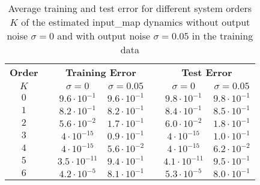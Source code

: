 \begin{commentnotes}
\begin{table}
        \renewcommand{\arraystretch}{1.3}
        \begin{tabularx}{1\textwidth}{@{}ccccccc@{}}
            \toprule
            \textbf{Order} & \phantom{a} & \multicolumn{2}{c}{\textbf{Training Error}} & \phantom{abc} & \multicolumn{2}{c}{\textbf{Test Error}} \\ \cmidrule{3-4} \cmidrule{6-7}
            $K$ && $\sigma = 0$ & $\sigma = 0.05$ && $\sigma = 0$ & $\sigma = 0.05$ \\ \midrule
            $0$ && $9.6 \cdot 10^{-1}$ & $9.6 \cdot 10^{-1}$ && $9.8 \cdot 10^{-1}$ & $9.8 \cdot 10^{-1}$ \\
            $1$ && $8.2 \cdot 10^{-1}$ & $8.2 \cdot 10^{-1}$ && $8.4 \cdot 10^{-1}$ & $8.5 \cdot 10^{-1}$ \\
            $2$ && $5.6 \cdot 10^{-2}$ & $1.7 \cdot 10^{-1}$ && $6.0 \cdot 10^{-2}$ & $1.8 \cdot 10^{-1}$\\
            $3$ && $4 \cdot 10^{-15}$ & $0.9 \cdot 10^{-1}$ && $4 \cdot 10^{-15}$ & $1.0 \cdot 10^{-1}$\\
            $4$ && $4 \cdot 10^{-15}$ & $5.6 \cdot 10^{-2}$ && $4 \cdot 10^{-15}$ & $6.2 \cdot 10^{-2}$\\
            $5$ && $3.5 \cdot 10^{-11}$ & $9.4 \cdot 10^{-1}$ && $4.1 \cdot 10^{-11}$ & $9.5 \cdot 10^{-1}$\\
            $6$ && $4.2 \cdot 10^{-5}$ & $8.1 \cdot 10^{-1}$ && $5.3 \cdot 10^{-5}$ & $8.0 \cdot 10^{-1}$\\
            \bottomrule
        \end{tabularx}
        \caption[Test and Training Errors of Input Transfer Maps for various System Orders]{Average training and test error for different system orders $K$ of the estimated \gls*{input_map} dynamics without output noise $\sigma = 0$ and with output noise $\sigma = 0.05$ in the training data}
        \label{tab:input_transfer_transfer_order}
\end{table} 
\end{commentnotes} 


